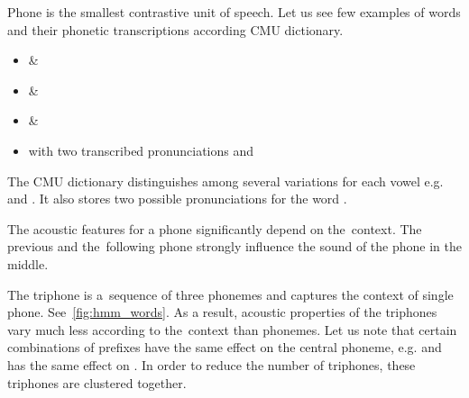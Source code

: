 {
Phone is the smallest contrastive unit of speech. 
Let us see few examples of words and their phonetic transcriptions according CMU dictionary\cite{weide1998cmu}.
\begin{itemize}
    \item {} \& 
    \item {} \& 
    \item {} \& 
    \item {} with two transcribed pronunciations  and 
\end{itemize}
The CMU dictionary distinguishes among several variations for each vowel e.g.  and .
It also stores two possible pronunciations for the word .

The acoustic features for a phone significantly depend on the~context.
The previous and the~following phone strongly influence the sound of the phone in the middle.

The triphone is a~sequence of three phonemes and captures the context of single phone.
See~\ref{fig:hmm_words}.
As a result, acoustic properties of the triphones vary much less according to the~context than phonemes.
Let us note that certain combinations of prefixes have the same effect on the central phoneme,
e.g.  and  has the same effect on . %
In order to reduce the number of triphones, these triphones are clustered together.



%     
%     

}
